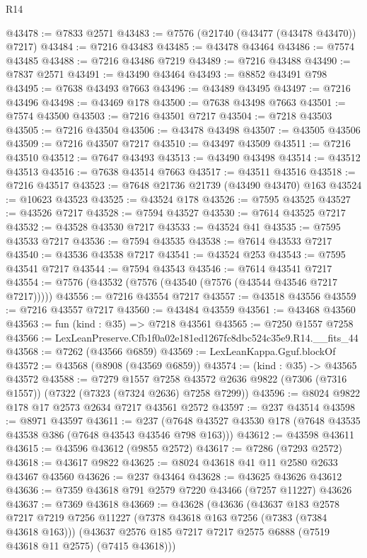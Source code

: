 \begin{lexlean}{R14}
\begin{coremodule}
@43478 := @7833 @2571
@43483 := @7576 (@21740 (@43477 (@43478 @43470)) @7217)
@43484 := @7216 @43483
@43485 := @43478 @43464
@43486 := @7574 @43485
@43488 := @7216 @43486 @7219
@43489 := @7216 @43488
@43490 := @7837 @2571
@43491 := @43490 @43464
@43493 := @8852 @43491 @798
@43495 := @7638 @43493 @7663
@43496 := @43489 @43495
@43497 := @7216 @43496
@43498 := @43469 @178
@43500 := @7638 @43498 @7663
@43501 := @7574 @43500
@43503 := @7216 @43501 @7217
@43504 := @7218 @43503
@43505 := @7216 @43504
@43506 := @43478 @43498
@43507 := @43505 @43506
@43509 := @7216 @43507 @7217
@43510 := @43497 @43509
@43511 := @7216 @43510
@43512 := @7647 @43493
@43513 := @43490 @43498
@43514 := @43512 @43513
@43516 := @7638 @43514 @7663
@43517 := @43511 @43516
@43518 := @7216 @43517
@43523 := @7648 @21736 @21739 (@43490 @43470) @163
@43524 := @10623 @43523
@43525 := @43524 @178
@43526 := @7595 @43525
@43527 := @43526 @7217
@43528 := @7594 @43527
@43530 := @7614 @43525 @7217
@43532 := @43528 @43530 @7217
@43533 := @43524 @41
@43535 := @7595 @43533 @7217
@43536 := @7594 @43535
@43538 := @7614 @43533 @7217
@43540 := @43536 @43538 @7217
@43541 := @43524 @253
@43543 := @7595 @43541 @7217
@43544 := @7594 @43543
@43546 := @7614 @43541 @7217
@43554 := @7576 (@43532 (@7576 (@43540 (@7576 (@43544 @43546 @7217 @7217)))))
@43556 := @7216 @43554 @7217
@43557 := @43518 @43556
@43559 := @7216 @43557 @7217
@43560 := @43484 @43559
@43561 := @43468 @43560
@43563 := fun (kind : @35) => @7218 @43561
@43565 := @7250 @1557 @7258
@43566 := LexLeanPreserve.Cfb1f0a02e181ed1267fc8dbc524c35e9.R14.__fits_44
@43568 := @7262 (@43566 @6859)
@43569 := LexLeanKappa.Gguf.blockOf
@43572 := @43568 (@8908 (@43569 @6859))
@43574 := (kind : @35) -> @43565 @43572
@43588 := @7279
    @1557
    @7258
    @43572
    @2636
    @9822
    (@7306 (@7316 @1557))
    (@7322 (@7323 (@7324 @2636) @7258 @7299))
@43596 := @8024 @9822 @178 @17 @2573 @2634 @7217 @43561 @2572
@43597 := @237 @43514
@43598 := @8971 @43597
@43611 := @237 (@7648 @43527 @43530 @178 (@7648 @43535 @43538 @386 (@7648 @43543 @43546 @798 @163)))
@43612 := @43598 @43611
@43615 := @43596 @43612 (@9855 @2572)
@43617 := @7286 (@7293 @2572)
@43618 := @43617 @9822
@43625 := @8024 @43618 @41 @11 @2580 @2633 @43467 @43560
@43626 := @237 @43464
@43628 := @43625 @43626 @43612
@43636 := @7359 @43618 @791 @2579 @7220 @43466 (@7257 @11227) @43626
@43637 := @7369 @43618
@43669 := @43628
    (@43636
      (@43637
        @183
        @2578
        @7217
        @7219
        @7256
        @11227
        (@7378 @43618 @163 @7256 (@7383 (@7384 @43618 @163)))
        (@43637 @2576 @185 @7217 @7217 @2575 @6888 (@7519 @43618 @11 @2575) (@7415 @43618)))

\end{coremodule}
\end{lexlean}
